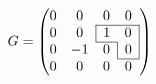 \documentclass{article}
\begin{document}
\begin{equation}
	G =
	\left(\begin{array}{@{}ccccc@{}}
		0 & 0 & 0 & 0 \\ 
  		\cline{3-4}
    	0 & 0 & \multicolumn{1}{|c}{1} & \multicolumn{1}{c|}{0} \\
    	\cline{3-3}		
		0 & -1 & 0 & \multicolumn{1}{|c|}{0}\\
		\cline{4-4}	
		0 & 0 & 0 & 0
	\end{array} 	
	\right)
\end{equation}
\end{document}
